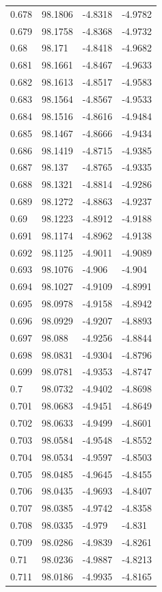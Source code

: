 \begin{tabular}{llll}
0.678 & 98.1806 & -4.8318 & -4.9782 \\
0.679 & 98.1758 & -4.8368 & -4.9732 \\
0.68 & 98.171 & -4.8418 & -4.9682 \\
0.681 & 98.1661 & -4.8467 & -4.9633 \\
0.682 & 98.1613 & -4.8517 & -4.9583 \\
0.683 & 98.1564 & -4.8567 & -4.9533 \\
0.684 & 98.1516 & -4.8616 & -4.9484 \\
0.685 & 98.1467 & -4.8666 & -4.9434 \\
0.686 & 98.1419 & -4.8715 & -4.9385 \\
0.687 & 98.137 & -4.8765 & -4.9335 \\
0.688 & 98.1321 & -4.8814 & -4.9286 \\
0.689 & 98.1272 & -4.8863 & -4.9237 \\
0.69 & 98.1223 & -4.8912 & -4.9188 \\
0.691 & 98.1174 & -4.8962 & -4.9138 \\
0.692 & 98.1125 & -4.9011 & -4.9089 \\
0.693 & 98.1076 & -4.906 & -4.904 \\
0.694 & 98.1027 & -4.9109 & -4.8991 \\
0.695 & 98.0978 & -4.9158 & -4.8942 \\
0.696 & 98.0929 & -4.9207 & -4.8893 \\
0.697 & 98.088 & -4.9256 & -4.8844 \\
0.698 & 98.0831 & -4.9304 & -4.8796 \\
0.699 & 98.0781 & -4.9353 & -4.8747 \\
0.7 & 98.0732 & -4.9402 & -4.8698 \\
0.701 & 98.0683 & -4.9451 & -4.8649 \\
0.702 & 98.0633 & -4.9499 & -4.8601 \\
0.703 & 98.0584 & -4.9548 & -4.8552 \\
0.704 & 98.0534 & -4.9597 & -4.8503 \\
0.705 & 98.0485 & -4.9645 & -4.8455 \\
0.706 & 98.0435 & -4.9693 & -4.8407 \\
0.707 & 98.0385 & -4.9742 & -4.8358 \\
0.708 & 98.0335 & -4.979 & -4.831 \\
0.709 & 98.0286 & -4.9839 & -4.8261 \\
0.71 & 98.0236 & -4.9887 & -4.8213 \\
0.711 & 98.0186 & -4.9935 & -4.8165 \\

\end{tabular}
